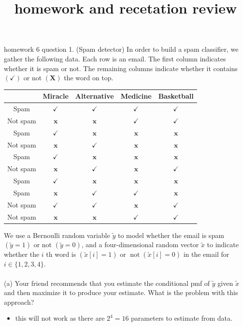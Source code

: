 \documentclass[10pt]{article}
\title{homework and recetation review  }
\author{}
\date{}
\begin{document}
\maketitle

homework 6 question 1. (Spam detector) In order to build a spam classifier, we gather the following data. Each row is an email. The first column indicates whether it is spam or not. The remaining columns indicate whether it contains $(\boldsymbol{\checkmark})$ or not $(\boldsymbol{X})$ the word on top.
\begin{tabular}{|c|c|c|c|c|}
\hline & Miracle & Alternative & Medicine & Basketball \\
\hline Spam & $\checkmark$ & $\checkmark$ & $\checkmark$ & $\checkmark$ \\
\hline Not spam & $\boldsymbol{x}$ & $\boldsymbol{x}$ & $\checkmark$ & $\checkmark$ \\
\hline Spam & $\checkmark$ & $\boldsymbol{x}$ & $\boldsymbol{x}$ & $\boldsymbol{x}$ \\
\hline Not spam & $\boldsymbol{x}$ & $\checkmark$ & $\boldsymbol{x}$ & $\boldsymbol{x}$ \\
\hline Spam & $\checkmark$ & $\boldsymbol{x}$ & $\boldsymbol{x}$ & $\boldsymbol{x}$ \\
\hline Not spam & $\boldsymbol{x}$ & $\checkmark$ & $\boldsymbol{x}$ & $\checkmark$ \\
\hline Spam & $\checkmark$ & $\boldsymbol{x}$ & $\boldsymbol{x}$ & $\boldsymbol{x}$ \\
\hline Spam & $\boldsymbol{x}$ & $\checkmark$ & $\checkmark$ & $\boldsymbol{x}$ \\
\hline Not spam & $\checkmark$ & $\checkmark$ & $\boldsymbol{x}$ & $\checkmark$ \\
\hline Not spam & $\boldsymbol{x}$ & $\boldsymbol{x}$ & $\checkmark$ & $\checkmark$ \\
\hline
\end{tabular}
We use a Bernoulli random variable $\tilde{y}$ to model whether the email is spam $(\tilde{y}=1)$ or not $(\tilde{y}=0)$, and a four-dimensional random vector $\tilde{x}$ to indicate whether the $i$ th word is $(\tilde{x}[i]=1)$ or $\operatorname{not}(\tilde{x}[i]=0)$ in the email for $i \in\{1,2,3,4\}$.\\\\
(a) Your friend recommends that you estimate the conditional pmf of $\tilde{y}$ given $\tilde{x}$ and then maximize it to produce your estimate. What is the problem with this approach?
\begin{itemize}
    \item this will not work as there are $2^4=16 $ parameters to estimate from data. 
\end{itemize}
\end{document}
